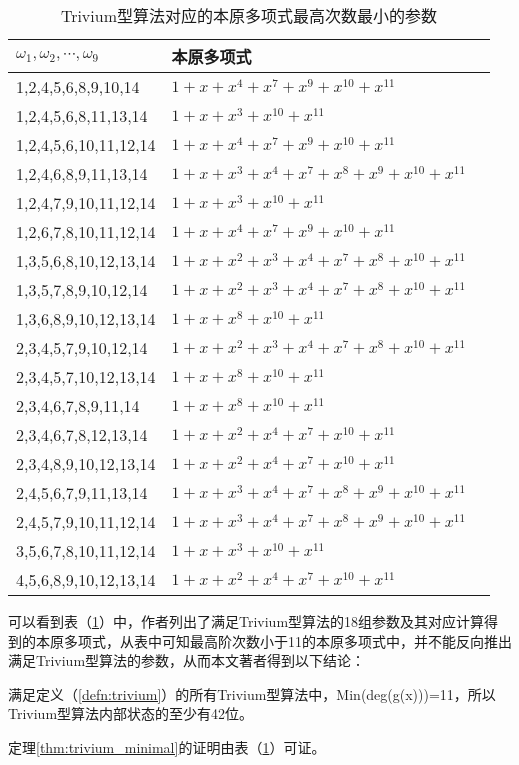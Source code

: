 \begin{table}[!hpb]
  \label{table:trivium_minimal}
  \centering
  \caption{Trivium型算法对应的本原多项式最高次数最小的参数}
  \begin{tabular}{@{}llr@{}} \toprule
    $\omega_{1},\omega_{2},\cdots,\omega_{9}$ & 本原多项式 \\ 
    \midrule
    1,2,4,5,6,8,9,10,14 & $1+x+x^{4}+x^{7}+x^{9}+x^{10}+x^{11}$ \\
    1,2,4,5,6,8,11,13,14 & $1+x+x^{3}+x^{10}+x^{11}$ \\
    1,2,4,5,6,10,11,12,14 & $1+x+x^{4}+x^{7}+x^{9}+x^{10}+x^{11}$ \\
    1,2,4,6,8,9,11,13,14 & $1+x+x^{3}+x^{4}+x^{7}+x^{8}+x^{9}+x^{10}+x^{11}$ \\
    1,2,4,7,9,10,11,12,14 & $1+x+x^{3}+x^{10}+x^{11}$ \\
    1,2,6,7,8,10,11,12,14 & $1+x+x^{4}+x^{7}+x^{9}+x^{10}+x^{11}$ \\
    1,3,5,6,8,10,12,13,14 & $1+x+x^{2}+x^{3}+x^{4}+x^{7}+x^{8}+x^{10}+x^{11}$ \\
    1,3,5,7,8,9,10,12,14 & $1+x+x^{2}+x^{3}+x^{4}+x^{7}+x^{8}+x^{10}+x^{11}$ \\
    1,3,6,8,9,10,12,13,14 & $1+x+x^{8}+x^{10}+x^{11}$ \\
    2,3,4,5,7,9,10,12,14 & $1+x+x^{2}+x^{3}+x^{4}+x^{7}+x^{8}+x^{10}+x^{11}$ \\
    2,3,4,5,7,10,12,13,14 & $1+x+x^{8}+x^{10}+x^{11}$ \\
    2,3,4,6,7,8,9,11,14 & $1+x+x^{8}+x^{10}+x^{11}$ \\
    2,3,4,6,7,8,12,13,14 & $1+x+x^{2}+x^{4}+x^{7}+x^{10}+x^{11}$ \\
    2,3,4,8,9,10,12,13,14 & $1+x+x^{2}+x^{4}+x^{7}+x^{10}+x^{11}$ \\
    2,4,5,6,7,9,11,13,14  & $1+x+x^{3}+x^{4}+x^{7}+x^{8}+x^{9}+x^{10}+x^{11}$ \\
    2,4,5,7,9,10,11,12,14 & $1+x+x^{3}+x^{4}+x^{7}+x^{8}+x^{9}+x^{10}+x^{11}$ \\
    3,5,6,7,8,10,11,12,14 & $1+x+x^{3}+x^{10}+x^{11}$ \\
    4,5,6,8,9,10,12,13,14 & $1+x+x^{2}+x^{4}+x^{7}+x^{10}+x^{11}$ \\
\end{tabular}
\end{table}

可以看到表（\ref{table:trivium_minimal}）中，作者列出了满足Trivium型算法的18组参数及其对应计算得到的本原多项式，从表中可知最高阶次数小于11的本原多项式中，并不能反向推出满足Trivium型算法的参数，从而本文著者得到以下结论：
\begin{thm}[Trivium型算法对应的本原多项式最高次数最小为11]
\label{thm:trivium_minimal}
满足定义（\ref{defn:trivium}）的所有Trivium型算法中，Min(deg(g(x)))=11，所以Trivium型算法内部状态的至少有42位。

定理\ref{thm:trivium_minimal}的证明由表（\ref{table:trivium_minimal}）可证。
\end{thm}

